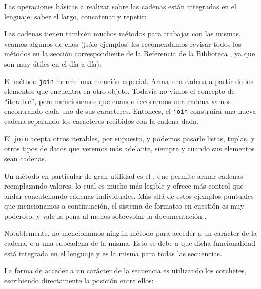 
Las operaciones básicas a realizar sobre las cadenas están integradas en el lenguaje: saber el largo, concatenar y repetir:


Las cadenas tienen también muchos métodos para trabajar con las mismas, veamos algunos de ellos (¡sólo ejemplos! les recomendamos revisar todos los métodos en la sección correspondiente de la Referencia de la Biblioteca \cite{stdlib_str}, ya que son muy útiles en el día a día):


El método \texttt{join} merece una mención especial. Arma una cadena a partir de los elementos que encuentra en otro objeto. Todavía no vimos el concepto de ``iterable'', pero mencionemos que cuando recorremos una cadena vamos encontrando cada uno de sus caracteres. Entonces, el \texttt{join} construirá una nueva cadena separando los caracteres recibidos con la cadena dada.


El \texttt{join} acepta otros iterables, por supuesto, y podemos pasarle listas, tuplas, y otros tipos de datos que veremos más adelante, siempre y cuando sus elementos sean cadenas.

Un método en particular de gran utilidad es el , que permite armar cadenas reemplazando valores, lo cual es mucho más legible y ofrece más control que andar concatenando cadenas individuales. Más allá de estos ejemplos puntuales que mencionamos a continuación, el sistema de formateo en cuestión es muy poderoso, y vale la pena al menos sobrevolar la documentación \cite{stdlib_format}.


Notablemente, no mencionamos ningún método para acceder a un carácter de la cadena, o a una subcadena de la misma. Esto se debe a que dicha funcionalidad está integrada en el lenguaje y es la misma para todas las secuencias.

La forma de acceder a un carácter de la secuencia es utilizando los corchetes, escribiendo directamente la posición entre ellos:


